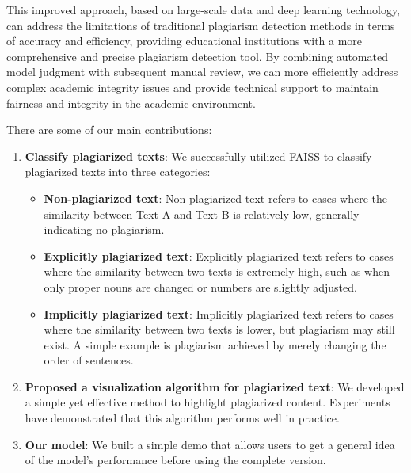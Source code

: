 This improved approach, based on large-scale data and deep learning technology, can address the limitations of traditional plagiarism detection methods in terms of accuracy and efficiency, providing educational institutions with a more comprehensive and precise plagiarism detection tool. By combining automated model judgment with subsequent manual review, we can more efficiently address complex academic integrity issues and provide technical support to maintain fairness and integrity in the academic environment.

There are some of our main contributions:

\begin{enumerate}
    \item \textbf{Classify plagiarized texts}:  
    We successfully utilized FAISS to classify plagiarized texts into three categories:  
    \begin{itemize}
        \item \textbf{Non-plagiarized text}: Non-plagiarized text refers to cases where the similarity between Text A and Text B is relatively low, generally indicating no plagiarism.  
        \item \textbf{Explicitly plagiarized text}: Explicitly plagiarized text refers to cases where the similarity between two texts is extremely high, such as when only proper nouns are changed or numbers are slightly adjusted.  
        \item \textbf{Implicitly plagiarized text}: Implicitly plagiarized text refers to cases where the similarity between two texts is lower, but plagiarism may still exist. A simple example is plagiarism achieved by merely changing the order of sentences.  
    \end{itemize}

    \item \textbf{Proposed a visualization algorithm for plagiarized text}:  
    We developed a simple yet effective method to highlight plagiarized content. Experiments have demonstrated that this algorithm performs well in practice.  

    \item \textbf{Our model}:  
    We built a simple demo that allows users to get a general idea of the model’s performance before using the complete version.
\end{enumerate}


